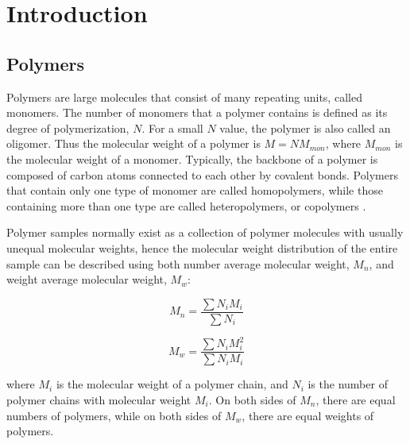\chapter{Introduction}
\graphicspath{{./introduction/graphs/}}

\onehalfspacing
\section{Polymers}

Polymers are large molecules that consist of many repeating units, called monomers. The number of monomers that a polymer contains is defined as its degree of polymerization, $N$. For a small $N$ value, the polymer is also called an oligomer. Thus the molecular weight of a polymer is $M = NM_{mon}$, where $M_{mon}$ is the molecular weight of a monomer. Typically, the backbone of a polymer is composed of carbon atoms connected to each other by covalent bonds. Polymers that contain only one type of monomer are called homopolymers, while those containing more than one type are called heteropolymers, or copolymers \cite{Rubinstein2003}. 

Polymer samples normally exist as a collection of polymer molecules with usually unequal molecular weights, hence the molecular weight distribution of the entire sample can be described using both number average molecular weight, $M_{n}$, and weight average molecular weight, $M_{w}$: 

\begin{equation}
\label{Mn}
M_{n} = \dfrac{\sum N_{i}M_{i}}{\sum N_{i}}
\end{equation}

\begin{equation}
\label{Mw}
M_{w} = \dfrac{\sum N_{i}M_{i}^{2}}{\sum N_{i}M_{i}}
\end{equation}

\noindent
where $M_{i}$ is the molecular weight of a polymer chain, and $N_{i}$ is the number of polymer chains with molecular weight $M_{i}$. On both sides of $M_{n}$, there are equal numbers of polymers, while on both sides of $M_{w}$, there are equal weights of polymers. 

